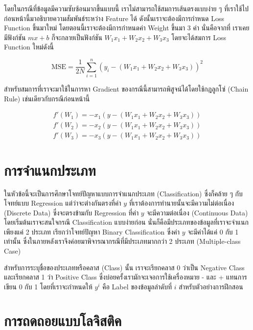 โดยในกรณีที่ข้อมูลมีความซับซ้อนมากขึ้นแบบนี้ เราไม่สามารถใช้สมการเส้นตรงแบบง่าย ๆ ที่เราใช้ไปก่อนหน้านี้มาอธิบายความสัมพันธ์ระหว่าง
Feature ได้ ดังนั้นเราจะต้องมีการกำหนด Loss Function ขึ้นมาใหม่ โดยตอนนี้เราจะต้องมีการกำหนดค่า Weight ขึ้นมา 3 ค่า นั่นคือจากที่%
เราเคยมีฟังก์ชัน $mx + b$ ก็จะกลายเป็นฟังก์ชัน $W_1 x_1 + W_2 x_2 + W_3 x_3$ โดยจะได้สมการ Loss Function ใหม่ดังนี้

\begin{equation}
    \text{MSE} = \frac{1}{2N} \sum_{i=1}^{n} (y_i - (W_1 x_1 + W_2 x_2 + W_3 x_3))^2
\end{equation}

สำหรับสมการที่เราจะมาใช้ในการหา Gradient ของกรณีนี้สามารถพิสูจน์ได้โดยใช้กฎลูกโซ่ (Chain Rule) เช่นเดียวกับกรณีก่อนหน้านี้

\begin{align}
    f'(W_1) = -x_1(y - (W_1 x_1 + W_2 x_2 + W_3 x_3)) \\
    f'(W_2) = -x_2(y - (W_1 x_1 + W_2 x_2 + W_3 x_3)) \\
    f'(W_3) = -x_3(y - (W_1 x_1 + W_2 x_2 + W_3 x_3))
\end{align}

\section{การจำแนกประเภท}
\label{sec:classification}

ในหัวข้อนี้จะเป็นการศึกษาโจทย์ปัญหาแบบการจำแนกประเภท (Classification) ซึ่งก็คล้าย ๆ กับโจทย์แบบ Regression แต่ว่าจะต่างกันตรงที่ค่า
$y$ ที่เราต้องการทำนายนั้นจะมีความไม่ต่อเนื่อง (Discrete Data) ซึ่งจะตรงข้ามกับ Regression ที่ค่า $y$ จะมีความต่อเนื่อง (Continuous
Data) โดยเริ่มต้นเราจะสนใจกรณี Classification แบบง่ายก่อน นั่นก็คือมีประเภทของข้อมูลที่เราจะจำแนกเพียงแค่ 2 ประเภท เรียกว่าโจทย์ปัญหา
Binary Classification ซึ่งค่า $y$ จะมีค่าได้แค่ 0 กับ 1 เท่านั้น ซึ่งในภายหลังเราจึงค่อยมาพิจารณากรณีที่มีประเภทมากกว่า 2 ประเภท
(Multiple-class Case)

สำหรับการระบุชื่อของประเภทหรือคลาส (Class) นั้น เราจะเรียกคลาส 0 ว่าเป็น Negative Class และเรียกคลาส 1 ว่า Positive Class
ซึ่งบ่อยครั้งเรามักจะเจอการใช้เครื่องหมาย - และ + แทนการเขียน 0 กับ 1 โดยที่เราจะกำหนดให้ $y^{i}$ คือ Label ของข้อมูลลำดับที่ $i$
สำหรับตัวอย่างการฝึกสอน

\section{การถดถอยแบบโลจิสติค}
\label{sec:logis_regress}

